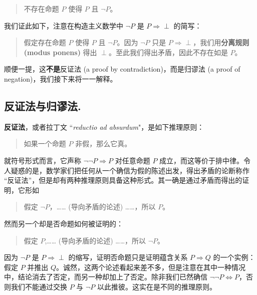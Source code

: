 \documentclass{ctexart}
\begin{document}
        \begin{quote}
            不存在命题 \( P \) 使得 \( P \) 且 \( \neg P \)。
        \end{quote}

      我们证此如下，注意在构造主义数学中 \( \neg P \) 是 \( P \Rightarrow \perp \) 的简写：

        \begin{quote}
            假定存在命题 \( P \) 使得 \( P \) 且 \( \neg P \)。因为 \( \neg P \) 只是 \( P \Rightarrow \perp \)，我们用\textbf{分离规则 (modus ponens)} 得出 \( \perp \)。至此我们得出矛盾，因此不存在如是 \( P \)。
        \end{quote}

      顺便一提，这\textbf{不是}反证法 (a proof by contradiction)，而是归谬法 (a proof of negation)，我们接下来将一一解释。

    \subsection{反证法与归谬法.}
        \textbf{反证法}，或者拉丁文 ``\emph{reductio ad absurdum}"，是如下推理原则：
        
          \begin{quote}
              {如果一个命题 \( P \) 非假，那么它真。}
          \end{quote}

        就符号形式而言，它声称 \( \neg \neg P \Rightarrow P \) 对任意命题 \( P \) 成立，而这等价于排中律。令人疑惑的是，数学家们把任何从一个确信为假的陈述出发，得出矛盾的论断称作 “反证法”，但是却有两种推理原则具备这种形式。其一确是通过矛盾而得出的证明，它形如

          \begin{quote}
              {假定 \( \neg P \)，…… (导向矛盾的论述) ……，所以 \( P \)。}
          \end{quote}

        然而另一个却是否命题如何被证明的：

          \begin{quote}
              {假定 \( P \),…… (导向矛盾的论述) ……，所以 \( \neg P \)。}
          \end{quote}

        因为 \( \neg P \) 是 \( P \Rightarrow \perp \) 的缩写，证明否命题只是证明蕴含关系 \( P \Rightarrow Q \) 的一个实例：假定 \( P \) 并推出 \( Q \)。诚然，这两个论述看起来差不多，但是注意在其中一种情况中，结论消去了否定，而另一种却加上了否定。除非我们已然确信 \( \neg \neg P \Leftrightarrow P \)，否则我们不能通过交换 \( P \) 与 \( \neg P \) 以此推彼。这实在是不同的推理原则。
\end{document}

